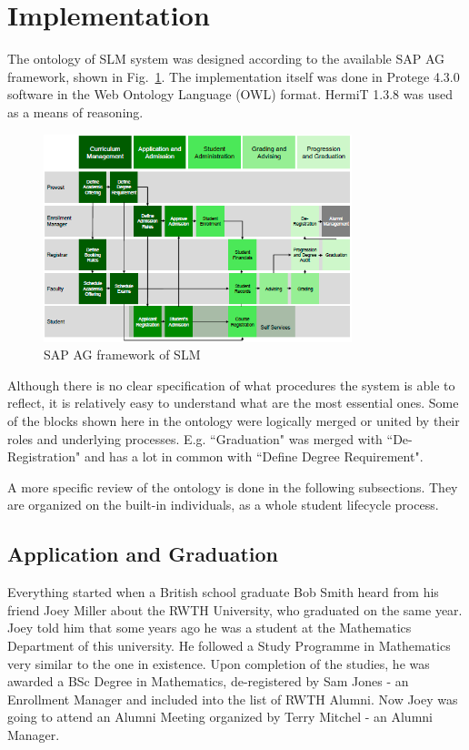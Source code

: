 \documentclass{article}    %
\begin{document}
\section{Implementation}
%
The ontology of SLM system was designed according to the available SAP AG framework, shown in Fig.~\ref{SAP}. The implementation itself was done in Protege 4.3.0 software in the Web Ontology Language (OWL) format. HermiT 1.3.8 was used as a means of reasoning. 
\begin{figure}[htbp]
  \centering
    \includegraphics[width=0.8\textwidth]{Materials/Figures/1.png}
    \caption{SAP AG framework of SLM~\cite{sap}}
  \label{SAP}
\end{figure}

Although there is no clear specification of what procedures the system is able to reflect, it is relatively easy to understand what are the most essential ones. Some of the blocks shown here in the ontology were logically merged or united by their roles and underlying processes. E.g. ``Graduation" was merged with ``De-Registration" and has a lot in common with ``Define Degree Requirement". 

A more specific review of the ontology is done in the following subsections. They are organized on the built-in individuals, as a whole student lifecycle process.
%
\subsection{Application and Graduation}
%
Everything started when a British school graduate Bob Smith heard from his friend Joey Miller about the RWTH University, who graduated on the same year. Joey told him that some years ago he was a student at the Mathematics Department of this university. He followed a Study Programme in Mathematics very similar to the one in existence. Upon completion of the studies, he was awarded a BSc Degree in Mathematics, de-registered by Sam Jones - an Enrollment Manager and included into the list of RWTH Alumni. Now Joey was going to attend an Alumni Meeting organized by Terry Mitchel - an Alumni Manager.
\end{document}
